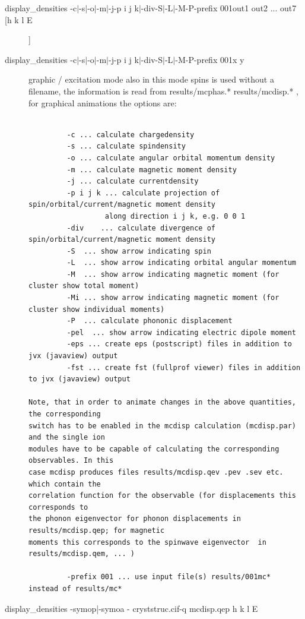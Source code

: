 \begin{description}
\item[display\_densities \lbrack-c$|$-s$|$-o$|$-m$|$-j\rbrack \lbrack -p i j k$|$-div\rbrack \lbrack -S$|$-L$|$-M\rbrack \lbrack -P\rbrack \lbrack -prefix 001\rbrack out1 out2 ... out7 [h k l E]]
\item[display\_densities \lbrack-c$|$-s$|$-o$|$-m$|$-j\rbrack \lbrack -p i j k$|$-div\rbrack \lbrack -S$|$-L$|$-M\rbrack \lbrack -P\rbrack \lbrack -prefix 001\rbrack  x y]
 graphic / excitation mode 
   also in this mode spins is used without a filename, the information is read from 
   results/mcphas.* results/mcdisp.* , for graphical animations the options are: 
\begin{verbatim}
   
         -c ... calculate chargedensity
         -s ... calculate spindensity
         -o ... calculate angular orbital momentum density
         -m ... calculate magnetic moment density
         -j ... calculate currentdensity
         -p i j k ... calculate projection of spin/orbital/current/magnetic moment density
                  along direction i j k, e.g. 0 0 1
         -div    ... calculate divergence of spin/orbital/current/magnetic moment density  
         -S  ... show arrow indicating spin
         -L  ... show arrow indicating orbital angular momentum
         -M  ... show arrow indicating magnetic moment (for cluster show total moment)
         -Mi ... show arrow indicating magnetic moment (for cluster show individual moments)
         -P  ... calculate phononic displacement
         -pel  ... show arrow indicating electric dipole moment
         -eps ... create eps (postscript) files in addition to jvx (javaview) output
         -fst ... create fst (fullprof viewer) files in addition to jvx (javaview) output

Note, that in order to animate changes in the above quantities, the corresponding
switch has to be enabled in the mcdisp calculation (mcdisp.par) and the single ion
modules have to be capable of calculating the corresponding observables. In this
case mcdisp produces files results/mcdisp.qev .pev .sev etc. which contain the 
correlation function for the observable (for displacements this corresponds to 
the phonon eigenvector for phonon displacements in results/mcdisp.qep; for magnetic
moments this corresponds to the spinwave eigenvector  in results/mcdisp.qem, ... )

         -prefix 001 ... use input file(s) results/001mc* instead of results/mc*
\end{verbatim} 
\item[display\_densities \lbrack-symop|-symoa  \lbrack- cryststruc.cif\rbrack  -q mcdisp.qep h k l \lbrack E \rbrack ]


\end{description}
